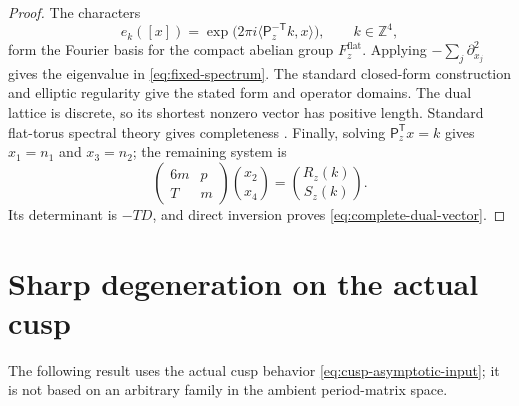 \documentclass[11pt]{article}
\numberwithin{equation}{section}
\theoremstyle{definition}
\theoremstyle{remark}
\newcommand{\Z}{\mathbb Z}
\newcommand{\T}{\mathbb T}
\begin{document}
\begin{proof}
The characters
\[
 e_k([x])=\exp\bigl(2\pi i\langle\mathsf P_z^{-\mathsf T}k,x\rangle\bigr),
 \qquad k\in\Z^4,
\]
form the Fourier basis for the compact abelian group $F_z^{\mathrm{flat}}$.
Applying $-\sum_j\partial_{x_j}^2$ gives the eigenvalue in
\eqref{eq:fixed-spectrum}.  The standard closed-form construction and
elliptic regularity give the stated form and operator domains.  The dual
lattice is discrete, so its shortest nonzero vector has positive length.
Standard flat-torus spectral theory gives completeness \citep{Chavel_1984}.
Finally, solving $\mathsf P_z^{\mathsf T}x=k$ gives $x_1=n_1$ and
$x_3=n_2$; the remaining system is
\[
 \begin{pmatrix}6m&p\\T&m\end{pmatrix}
 \binom{x_2}{x_4}=\binom{R_z(k)}{S_z(k)}.
\]
Its determinant is $-TD$, and direct inversion proves
\eqref{eq:complete-dual-vector}.
\end{proof}

\section{Sharp degeneration on the actual cusp}

The following result uses the actual cusp behavior \eqref{eq:cusp-asymptotic-input}; it is not based on an arbitrary family in the ambient period-matrix space.
\end{document}
